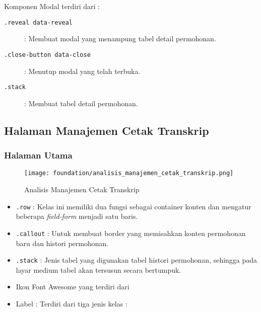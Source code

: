 Komponen Modal terdiri dari :
\begin{description}
	\item [\texttt{.reveal data-reveal}] : Membuat modal yang menampung tabel detail permohonan.
	\item [\texttt{.close-button data-close}] : Menutup modal yang telah terbuka.
	\item [\texttt{.stack}] :	Membuat tabel detail permohonan.
\end{description}
\subsection{Halaman Manajemen Cetak Transkrip}
\subsubsection{Halaman Utama}
\begin{figure} [H]
	\centering  
	\texttt{[image: foundation/analisis\_manajemen\_cetak\_transkrip.png]}
	\caption{Analisis Manajemen Cetak Transkrip} 
\end{figure}
\begin{itemize}
	\item \texttt{.row} : Kelas ini memiliki dua fungsi sebagai container konten dan mengatur beberapa \textit{field-form} menjadi satu baris. 
	\item \texttt{.callout} : Untuk membuat border yang memisahkan konten permohonan baru dan histori permohonan.
	\item \texttt{.stack} : Jenis tabel yang digunakan tabel histori permohonan, sehingga pada layar medium tabel akan tersusun secara bertumpuk.
	\item Ikon Font Awesome yang terdiri dari 
	\item Label : Terdiri dari tiga jenis kelas :
	
\end{itemize}
